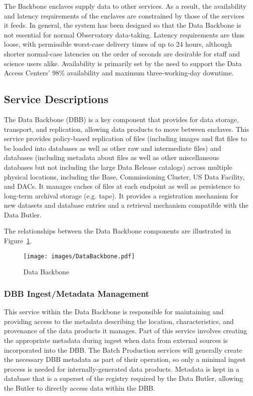 \documentclass[DM,toc,lsstdraft]{lsstdoc}
\begin{document}
The Backbone enclaves supply data to other services.
As a result, the availability and latency requirements of the enclaves are constrained by those of the services it feeds.
In general, the system has been designed so that the Data Backbone is not essential for normal Observatory data-taking.
Latency requirements are thus loose, with permissible worst-case delivery times of up to 24 hours, although shorter normal-case latencies on the order of seconds are desirable for staff and science users alike.
Availability is primarily set by the need to support the Data Access Centers' 98\% availability and maximum three-working-day downtime.

\subsection{Service Descriptions}\label{backbone-service-descriptions}

The Data Backbone (DBB) is a key component that provides for data storage, transport, and replication, allowing data products to move between enclaves.
This service provides policy-based replication of files (including images and flat files to be loaded into databases as well as other raw and intermediate files) and databases (including metadata about files as well as other miscellaneous databases but not including the large Data Release catalogs) across multiple physical locations, including the Base, Commissioning Cluster, US Data Facility, and DACs.
It manages caches of files at each endpoint as well as persistence to long-term archival storage (e.g. tape).
It provides a registration mechanism for new datasets and database entries and a retrieval mechanism compatible with the Data Butler.

The relationships between the Data Backbone components are illustrated
in Figure~\ref{fig:dbb}.

\begin{figure}
\centering
\texttt{[image: images/DataBackbone.pdf]}
\caption{Data Backbone}
\label{fig:dbb}
\end{figure}

\subsubsection{DBB Ingest/Metadata Management}\label{dbb-ingest-metadata}

This service within the Data Backbone is responsible for maintaining and providing access to the metadata describing the location, characteristics, and provenance of the data products it manages.
Part of this service involves creating the appropriate metadata during ingest when data from external sources is incorporated into the DBB.
The Batch Production services will generally create the necessary DBB metadata as part of their operation, so only a minimal ingest process is needed for internally-generated data products.
Metadata is kept in a database that is a superset of the registry required by the Data Butler, allowing the Butler to directly access data within the DBB.
\end{document}
